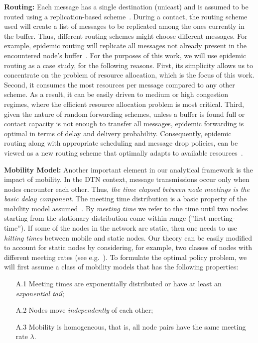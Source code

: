 \textbf{Routing:} Each message has a single destination (unicast) and is assumed to be routed using a replication-based scheme~\cite{akis:ton-multi}. During a contact, the routing scheme used will create a list of messages to be replicated among the ones currently in the buffer. Thus, different routing schemes might choose different messages. For example, epidemic routing will replicate all messages not already present in the encountered node's buffer~\cite{Vahdat:epidemic}. For the purposes of this work, we will use epidemic routing as a case study, for the following reasons. First, its simplicity allows us to concentrate on the problem of resource allocation, which is the focus of this work. Second, it consumes the most resources per message compared to any other scheme. As a result, it can be easily driven to medium or high congestion regimes, where the efficient resource allocation problem is most critical. Third, given the nature of random forwarding schemes, unless a buffer is found full or contact capacity is not enough to transfer all messages, epidemic forwarding is optimal in terms of delay and delivery probability. Consequently, epidemic routing along with appropriate scheduling and message drop policies, can be viewed as a new routing scheme that optimally adapts to available resources~\cite{Levine:Sigcomm07}. 

\textbf{Mobility Model:} Another important element in our analytical framework is the impact of mobility. In the DTN context, message transmissions occur only when nodes encounter each other. Thus, \emph{the time elapsed between node meetings is the basic delay component}. The meeting time distribution is a basic property of the mobility model assumed~\cite{akis:mobihoc06,Inria:MessageDelay}. By \emph{meeting time} we refer to the time until two nodes starting from the stationary distribution come within range (''first meeting-time''). If some of the nodes in the network are static, then one needs to use \emph{hitting times} between mobile and static nodes. Our theory can be easily modified to account for static nodes by considering, for example, two classes of nodes with different meeting rates (see e.g.~\cite{akis09}). To formulate the optimal policy problem, we will first assume a class of mobility models that has the following properties:
\begin{enumerate}
\item [A.1] Meeting times are exponentially distributed or have at least an \emph{exponential tail};
\item [A.2] Nodes move \emph{independently} of each other;
\item [A.3] Mobility is homogeneous, that is, all node pairs have the same meeting rate $\lambda$.
\end{enumerate}


